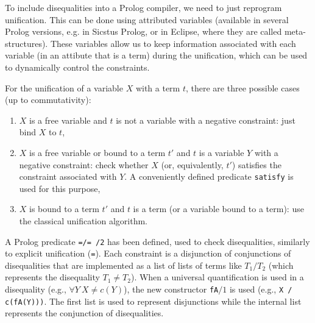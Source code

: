 \documentclass{llncs}
\begin{document}
To include disequalities into a Prolog compiler, we need to just
reprogram unification. This can be done using attributed variables
\cite{Carlsson} (available in several Prolog versions, e.g. in Sicstus
Prolog, or in Eclipse, where they are called meta-structures). These
variables allow us to keep information associated with each variable
(in an attibute that is a term) during the unification, which can be
used to dynamically control the constraints.


For the unification of a variable $X$ with a term $t$, there are three
possible cases (up to commutativity):

\begin{enumerate}

   \item $X$ is a free variable and $t$ is not a variable with a
   negative constraint: just bind $X$ to $t$,

   \item $X$ is a free variable or bound to a term $t'$ and $t$ is a
   variable $Y$ with a negative constraint: check whether $X$ (or,
   equivalently, $t'$) satisfies the constraint associated with $Y$.
   A conveniently defined predicate {\tt satisfy} is used for this
   purpose,

   \item $X$ is bound to a term $t'$ and $t$ is a term (or a variable
   bound to a term): use the classical unification algorithm.

\end{enumerate}

A Prolog predicate {\tt =/= /2} \cite{SusanaPADL2000} has been
defined, used to check disequalities, similarly to explicit
unification ({\tt =}). Each constraint is a disjunction of
conjunctions of disequalities that are implemented as a list of lists
of terms like $T_1/T_2$ (which represents the disequality $T_1 \neq
T_2$). When a universal quantification is used in a disequality (e.g.,
$\forall Y~ X \neq c(Y)$), the new constructor {\tt fA}$/1$ is used
(e.g., {\tt X / c(fA(Y)))}.  The first list is used to represent
disjunctions while the internal list represents the conjunction of
disequalities.
\end{document}
